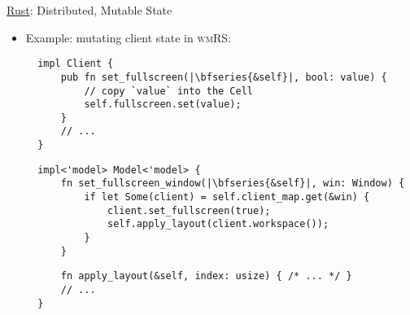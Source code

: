 \begin{frame}[fragile]{\underline{Rust}: Distributed, Mutable State \hfill {\footnotesize \currentname}}


    \begin{itemize}

    \item Example: mutating client state in \textsc{wmRS}:\\[3pt]
\begin{verbatim}
  impl Client {
      pub fn set_fullscreen(|\bfseries{&self}|, bool: value) {
          // copy `value` into the Cell
          self.fullscreen.set(value);
      }
      // ...
  }
\end{verbatim}

\vspace*{6pt}\begin{verbatim}
  impl<'model> Model<'model> {
      fn set_fullscreen_window(|\bfseries{&self}|, win: Window) {
          if let Some(client) = self.client_map.get(&win) {
              client.set_fullscreen(true);
              self.apply_layout(client.workspace());
          }
      }
\end{verbatim}
\begin{verbatim}
      fn apply_layout(&self, index: usize) { /* ... */ }
      // ...
  }
\end{verbatim}

    \end{itemize}

    \vfill

\end{frame}


